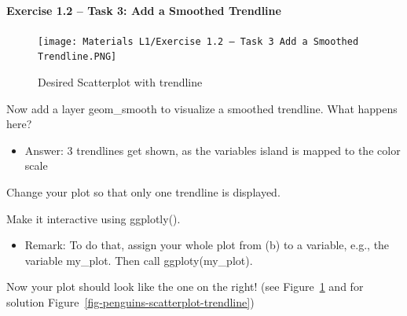 \documentclass[
  letterpaper,
  DIV=11,
  numbers=noendperiod]{scrartcl}
\let\oldparagraph\paragraph
\renewcommand{\paragraph}[1]{\oldparagraph{#1}\mbox{}}
\providecommand{\tightlist}{%
  \setlength{\itemsep}{0pt}\setlength{\parskip}{0pt}}\usepackage{longtable,booktabs,array}
\begin{document}
\hypertarget{exercise-1.2-task-3-add-a-smoothed-trendline}{%
\paragraph{Exercise 1.2 -- Task 3: Add a Smoothed
Trendline}\label{exercise-1.2-task-3-add-a-smoothed-trendline}}

\begin{figure}

{\centering \texttt{[image: Materials L1/Exercise 1.2 – Task 3 Add a Smoothed Trendline.PNG]}

}

\caption{\label{fig-scatterplot-trendline}Desired Scatterplot with
trendline}

\end{figure}

Now add a layer geom\_smooth to visualize a smoothed trendline. What
happens here?

\begin{itemize}
\tightlist
\item
  Answer: 3 trendlines get shown, as the variables island is mapped to
  the color scale
\end{itemize}

Change your plot so that only one trendline is displayed.

Make it interactive using ggplotly().

\begin{itemize}
\tightlist
\item
  Remark: To do that, assign your whole plot from (b) to a variable,
  e.g., the variable my\_plot. Then call ggploty(my\_plot).
\end{itemize}

Now your plot should look like the one on the right! (see
Figure~\ref{fig-scatterplot-trendline} and for solution
Figure~\ref{fig-penguins-scatterplot-trendline})
\end{document}
